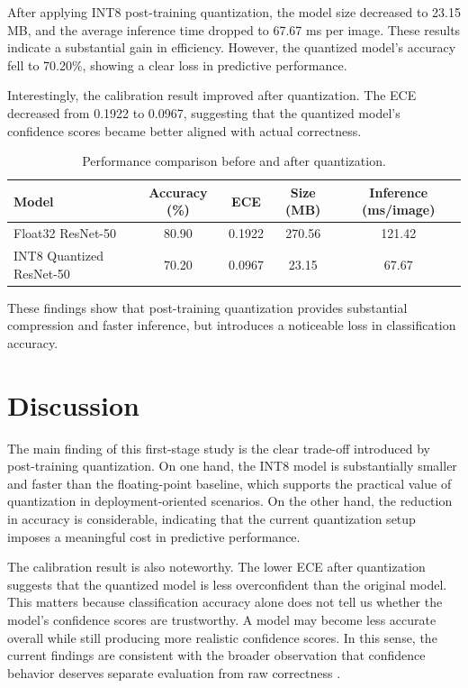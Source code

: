 \documentclass{article} %
\begin{document}
After applying INT8 post-training quantization, the model size decreased to 23.15 MB, and the average inference time dropped to 67.67 ms per image. These results indicate a substantial gain in efficiency. However, the quantized model's accuracy fell to 70.20\%, showing a clear loss in predictive performance.

Interestingly, the calibration result improved after quantization. The ECE decreased from 0.1922 to 0.0967, suggesting that the quantized model's confidence scores became better aligned with actual correctness.

\begin{table}[t]
\centering
\caption{Performance comparison before and after quantization.}
\label{tab:results}
\begin{tabular}{lcccc}
\toprule
Model & Accuracy (\%) & ECE & Size (MB) & Inference (ms/image) \\
\midrule
Float32 ResNet-50 & 80.90 & 0.1922 & 270.56 & 121.42 \\
INT8 Quantized ResNet-50 & 70.20 & 0.0967 & 23.15 & 67.67 \\
\bottomrule
\end{tabular}
\end{table}

These findings show that post-training quantization provides substantial compression and faster inference, but introduces a noticeable loss in classification accuracy.

\section{Discussion}

The main finding of this first-stage study is the clear trade-off introduced by post-training quantization. On one hand, the INT8 model is substantially smaller and faster than the floating-point baseline, which supports the practical value of quantization in deployment-oriented scenarios. On the other hand, the reduction in accuracy is considerable, indicating that the current quantization setup imposes a meaningful cost in predictive performance.

The calibration result is also noteworthy. The lower ECE after quantization suggests that the quantized model is less overconfident than the original model. This matters because classification accuracy alone does not tell us whether the model's confidence scores are trustworthy. A model may become less accurate overall while still producing more realistic confidence scores. In this sense, the current findings are consistent with the broader observation that confidence behavior deserves separate evaluation from raw correctness \citep{guo2017calibration}.
\end{document}
